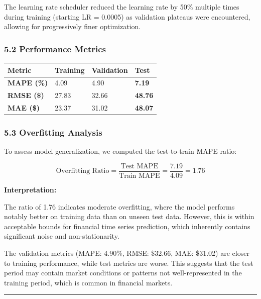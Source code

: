 \documentclass[
]{article}
\newcounter{none} %
\begin{document}
The learning rate scheduler reduced the learning rate by 50\% multiple
times during training (starting LR = 0.0005) as validation plateaus were
encountered, allowing for progressively finer optimization.

\subsubsection{5.2 Performance Metrics}\label{52-performance-metrics}

{\def\LTcaptype{none} %
\begin{longtable}[]{@{}llll@{}}
\toprule\noalign{}
Metric & Training & Validation & Test \\
\midrule\noalign{}
\endhead
\bottomrule\noalign{}
\endlastfoot
\textbf{MAPE (\%)} & 4.09 & 4.90 & \textbf{7.19} \\
\textbf{RMSE (\$)} & 27.83 & 32.66 & \textbf{48.76} \\
\textbf{MAE (\$)} & 23.37 & 31.02 & \textbf{48.07} \\
\end{longtable}
}

\subsubsection{5.3 Overfitting Analysis}\label{53-overfitting-analysis}

To assess model generalization, we computed the test-to-train MAPE
ratio:

\[\text{Overfitting Ratio} = \frac{\text{Test MAPE}}{\text{Train MAPE}} = \frac{7.19}{4.09} = 1.76\]

\textbf{Interpretation:}

The ratio of 1.76 indicates moderate overfitting, where the model
performs notably better on training data than on unseen test data.
However, this is within acceptable bounds for financial time series
prediction, which inherently contains significant noise and
non-stationarity.

The validation metrics (MAPE: 4.90\%, RMSE: \$32.66, MAE: \$31.02) are
closer to training performance, while test metrics are worse. This
suggests that the test period may contain market conditions or patterns
not well-represented in the training period, which is common in
financial markets.


\begin{center}\rule{0.5\linewidth}{0.5pt}\end{center}
\end{document}
